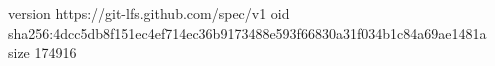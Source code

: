 version https://git-lfs.github.com/spec/v1
oid sha256:4dcc5db8f151ec4ef714ec36b9173488e593f66830a31f034b1c84a69ae1481a
size 174916

